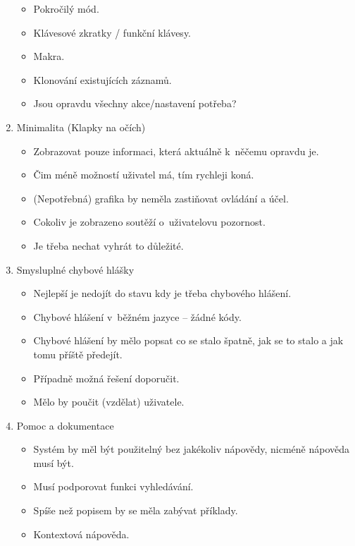 \begin{enumerate}
\begin{itemize}
            \item Pokročilý mód.
            \item Klávesové zkratky / funkční klávesy.
            \item Makra.
            \item Klonování existujících záznamů.
            \item Jsou opravdu všechny akce/nastavení potřeba?
        \end{itemize}
    \item Minimalita (Klapky na očích)
        \begin{itemize}
            \item Zobrazovat pouze informaci, která aktuálně k~něčemu opravdu je.
            \item Čim méně možností uživatel má, tím rychleji koná.
            \item (Nepotřebná) grafika by neměla zastiňovat ovládání a účel.
            \item Cokoliv je zobrazeno soutěží o~uživatelovu pozornost.
            \item Je třeba nechat vyhrát to důležité.
        \end{itemize}
    \item Smysluplné chybové hlášky
        \begin{itemize}
            \item Nejlepší je nedojít do stavu kdy je třeba chybového hlášení.
            \item Chybové hlášení v~běžném jazyce – žádné kódy.
            \item Chybové hlášení by mělo popsat co se stalo špatně, jak se to stalo a jak tomu příště předejít.
            \item Případně možná řešení doporučit.
            \item Mělo by poučit (vzdělat) uživatele.
        \end{itemize}
    \item Pomoc a dokumentace
        \begin{itemize}
            \item Systém by měl být použitelný bez jakékoliv nápovědy, nicméně nápověda musí být.
            \item Musí podporovat funkci vyhledávání.
            \item Spíše než popisem by se měla zabývat příklady.
            \item Kontextová nápověda.
        \end{itemize}
\end{enumerate}

